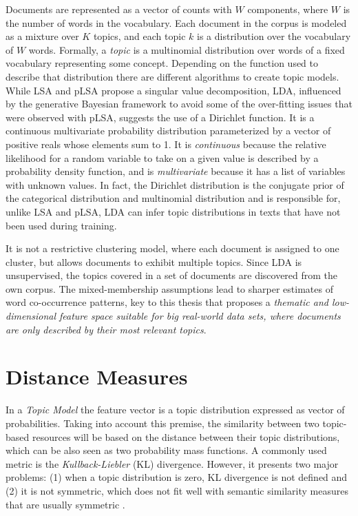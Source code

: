 Documents are represented as a vector of counts with $W$ components, where $W$ is the number of words in the vocabulary. Each document in the corpus is modeled as a mixture over $K$ topics, and each topic $k$ is a distribution over the vocabulary of $W$ words. Formally, a \textit{topic} is a multinomial distribution over words of a fixed vocabulary representing some concept. Depending on the function used to describe that distribution there are different algorithms to create topic models. While LSA and pLSA propose a singular value decomposition, LDA, influenced by the generative Bayesian framework to avoid some of the over-fitting issues that were observed with pLSA, suggests the use of a Dirichlet function. It is a continuous multivariate probability distribution parameterized by a vector of positive reals whose elements sum to 1.  It is \textit{continuous} because the relative likelihood for a random variable to take on a given value is described by a probability density function, and is \textit{multivariate} because it has a list of variables with unknown values. In fact, the Dirichlet distribution is the conjugate prior of the categorical distribution and multinomial distribution and is responsible for, unlike LSA and pLSA, LDA can infer topic distributions in texts that have not been used during training.

It is not a restrictive clustering model, where each document is assigned to one cluster, but allows documents to exhibit multiple topics. Since LDA is unsupervised, the topics covered in a set of documents are discovered from the own corpus. The mixed-membership assumptions lead to sharper estimates of word co-occurrence patterns, key to this thesis that proposes a \textit{thematic and low-dimensional feature space suitable for big real-world data sets, where documents are only described by their most relevant topics}.


\section{Distance Measures}

In a \textit{Topic Model} the feature vector is a topic distribution expressed as vector of probabilities. Taking into account this premise, the similarity between two topic-based resources will be based on the distance between their topic distributions, which can be also seen as two probability mass functions. A commonly used metric is the \textit{Kullback-Liebler} (KL) divergence. However, it presents two major problems: (1) when a topic distribution is zero, KL divergence is not defined and (2) it is not symmetric, which does not fit well with semantic similarity measures that are usually symmetric \cite{Rus2013}.

